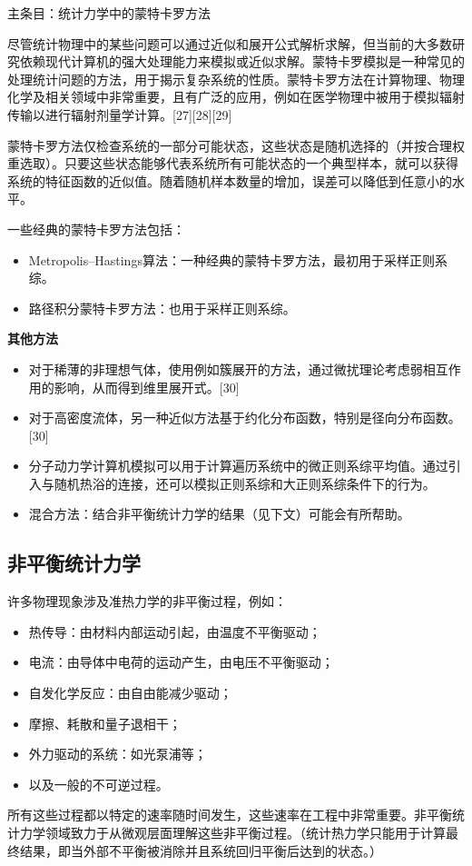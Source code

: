 主条目：统计力学中的蒙特卡罗方法

尽管统计物理中的某些问题可以通过近似和展开公式解析求解，但当前的大多数研究依赖现代计算机的强大处理能力来模拟或近似求解。蒙特卡罗模拟是一种常见的处理统计问题的方法，用于揭示复杂系统的性质。蒙特卡罗方法在计算物理、物理化学及相关领域中非常重要，且有广泛的应用，例如在医学物理中被用于模拟辐射传输以进行辐射剂量学计算。[27][28][29]

蒙特卡罗方法仅检查系统的一部分可能状态，这些状态是随机选择的（并按合理权重选取）。只要这些状态能够代表系统所有可能状态的一个典型样本，就可以获得系统的特征函数的近似值。随着随机样本数量的增加，误差可以降低到任意小的水平。

一些经典的蒙特卡罗方法包括：
\begin{itemize}
\item Metropolis–Hastings算法：一种经典的蒙特卡罗方法，最初用于采样正则系综。
\item 路径积分蒙特卡罗方法：也用于采样正则系综。
\end{itemize}
\textbf{其他方法}
\begin{itemize}
\item 对于稀薄的非理想气体，使用例如簇展开的方法，通过微扰理论考虑弱相互作用的影响，从而得到维里展开式。[30]  
\item 对于高密度流体，另一种近似方法基于约化分布函数，特别是径向分布函数。[30]  
\item 分子动力学计算机模拟可以用于计算遍历系统中的微正则系综平均值。通过引入与随机热浴的连接，还可以模拟正则系综和大正则系综条件下的行为。  
\item 混合方法：结合非平衡统计力学的结果（见下文）可能会有所帮助。
\end{itemize}
\subsection{非平衡统计力学}
许多物理现象涉及准热力学的非平衡过程，例如：  
\begin{itemize}
\item 热传导：由材料内部运动引起，由温度不平衡驱动；  
\item 电流：由导体中电荷的运动产生，由电压不平衡驱动；  
\item 自发化学反应：由自由能减少驱动；  
\item 摩擦、耗散和量子退相干；  
\item 外力驱动的系统：如光泵浦等；  
\item 以及一般的不可逆过程。  
\end{itemize}
所有这些过程都以特定的速率随时间发生，这些速率在工程中非常重要。非平衡统计力学领域致力于从微观层面理解这些非平衡过程。（统计热力学只能用于计算最终结果，即当外部不平衡被消除并且系统回归平衡后达到的状态。）

